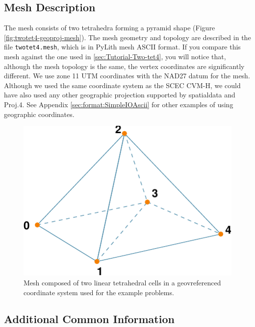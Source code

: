 \subsection{Mesh Description}

The mesh consists of two tetrahedra forming a pyramid shape (Figure
\vref{fig:twotet4-geoproj-mesh}). The mesh geometry and topology are
described in the file \texttt{twotet4.mesh}, which is in PyLith mesh
ASCII format. If you compare this mesh against the one used in \vref{sec:Tutorial-Two-tet4},
you will notice that, although the mesh topology is the same, the
vertex coordinates are significantly different. We use zone 11 UTM
coordinates with the NAD27 datum for the mesh. Although we used the
same coordinate system as the SCEC CVM-H, we could have also used
any other geographic projection supported by spatialdata and Proj.4.
See Appendix \vref{sec:format:SimpleIOAscii} for other examples
of using geographic coordinates. 

\noindent \begin{center}
\begin{figure}
\begin{centering}
\includegraphics{tutorials/twocells/figs/twotet4-mesh}
\par\end{centering}

\caption{Mesh composed of two linear tetrahedral cells in a geovreferenced coordinate
system used for the example problems.\label{fig:twotet4-geoproj-mesh}}
\end{figure}

\par\end{center}


\subsection{Additional Common Information}

